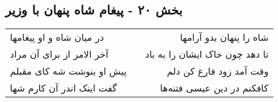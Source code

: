\begin{center}
\section*{بخش ۲۰ - پیغام شاه پنهان با وزیر}
\label{sec:sh020}
\begin{longtable}{l p{0.5cm} r}
در میان شاه و او پیغامها
&&
شاه را پنهان بدو آرامها
\\
آخر الامر از برای آن مراد
&&
تا دهد چون خاک ایشان را به باد
\\
پیش او بنوشت شه کای مقبلم
&&
وقت آمد زود فارغ کن دلم
\\
گفت اینک اندر آن کارم شها
&&
کافکنم در دین عیسی فتنه‌ها
\\
\end{longtable}
\end{center}
